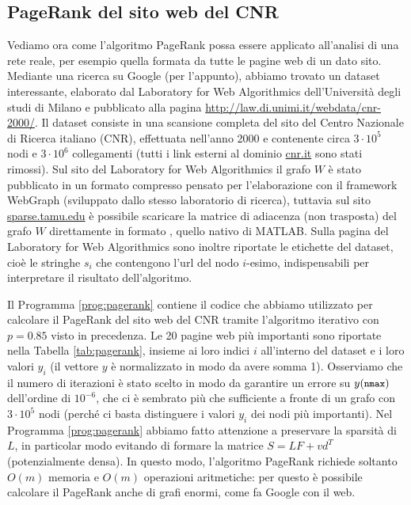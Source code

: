 \subsection*{PageRank del sito web del CNR}

Vediamo ora come l'algoritmo PageRank possa essere applicato all'analisi di
una rete reale, per esempio quella formata da tutte le pagine web di un
dato sito. Mediante una ricerca su Google (per l'appunto), abbiamo trovato un
dataset interessante, elaborato dal Laboratory for Web Algorithmics
dell'Università degli studi di Milano e pubblicato alla pagina
\url{http://law.di.unimi.it/webdata/cnr-2000/}.
Il dataset consiste in una scansione completa del sito del
Centro Nazionale di Ricerca italiano (CNR), effettuata nell'anno 2000
e contenente circa $3 \cdot 10^5$ nodi e $3 \cdot 10^6$ collegamenti
(tutti i link esterni al dominio \url{cnr.it} sono stati rimossi).
Sul sito del Laboratory for Web Algorithmics il grafo $W$ è stato pubblicato
in un formato compresso pensato per l'elaborazione con il framework WebGraph
(sviluppato dallo stesso laboratorio di ricerca), tuttavia sul sito
\url{sparse.tamu.edu} è possibile scaricare la matrice di adiacenza (non trasposta)
del grafo $W$ direttamente in formato , quello nativo di MATLAB.
Sulla pagina del Laboratory for Web Algorithmics sono inoltre riportate
le etichette del dataset, cioè le stringhe $s_i$ che contengono l'url
del nodo $i$-esimo, indispensabili per interpretare il risultato
dell'algoritmo.

Il Programma \ref{prog:pagerank} contiene il codice che abbiamo utilizzato
per calcolare il PageRank del sito web del CNR tramite l'algoritmo
iterativo con $p = 0.85$ visto in precedenza. Le 20 pagine web più importanti
sono riportate nella Tabella \ref{tab:pagerank}, insieme ai loro indici
$i$ all'interno del dataset e i loro valori $y_i$
(il vettore $y$ è normalizzato in modo da avere somma 1).
Osserviamo che il numero di iterazioni  è stato scelto in modo
da garantire un errore su $y(\text{\code{nmax}})$ dell'ordine di $10^{-6}$, che ci è
sembrato più che sufficiente a fronte di un grafo con $3 \cdot 10^5$ nodi
(perché ci basta distinguere i valori $y_i$ dei nodi più importanti).
Nel Programma \ref{prog:pagerank} abbiamo fatto attenzione a preservare
la sparsità di $L$, in particolar modo evitando di formare la matrice
$S = LF + vd^T$ (potenzialmente densa). In questo modo, l'algoritmo PageRank
richiede soltanto $O(m)$ memoria e $O(m)$ operazioni aritmetiche: per questo
è possibile calcolare il PageRank anche di grafi enormi, come fa Google con il web.

